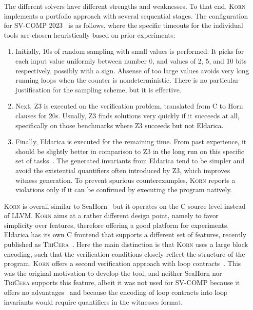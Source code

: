 \documentclass{llncs}
\newcommand{\Korn}{\textsc{Korn}\xspace}
\begin{document}
The different solvers have different strengths and weaknesses.
To that end, \Korn implements a portfolio approach with several sequential stages.
The configuration for SV-COMP 2023~\cite{SVCOMP23} is as follows,
where the specific timeouts for the individual tools are chosen heuristically based
on prior experiments:
\begin{enumerate}
    \item Initially, 10s of random sampling with small values is performed.
          It picks for each input value uniformly between number 0, and values of 2, 5, and 10 bits respectively, possibly with a sign.
          Absense of too large values avoids very long running loops
          when the counter is nondeterministic.
          There is no particular justification for the sampling scheme,
          but it is effective.
    \item Next, Z3 is executed on the verification problem, translated from C to Horn clauses for 20s. Usually, Z3 finds solutions very quickly if it succeeds at all,
          specifically on those benchmarks where Z3 succeeds but not Eldarica.
    \item Finally, Eldarica is executed for the remaining time.
          From past experience, it should be slightly better in comparison to Z3 in the long run on this specific set of tasks~\cite{ernst:arxiv2020:summaries}.
    The generated invariants from Eldarica tend to be simpler and avoid the existential quantifiers
    often introduced by Z3, which improves witness generation.
    To prevent spurious counterexamples,
    \Korn reports a violations only if it can be confirmed by executing the program natively.
\end{enumerate}
\Korn is overall similar to SeaHorn~\cite{gurfinkel2015seahorn} but it operates on the C source level instead of LLVM.
\Korn aims at a rather different design point, namely to favor simplicity over features, therefore offering a good platform for experiments.
Eldarica has its own C frontend that supports a different set of features,
recently published as \textsc{TriCera}~\cite{esen2022tricera}.
Here the main distinction is that \Korn uses a large block encoding,
such that the verification conditions closely reflect the structure of the program.
\Korn offers a second verification approach with loop contracts~\cite{hehner1999refinement,tuerk2010local,hehner2005specified,ernst:vmcai2022}.
This was the original motivation to develop the tool, and neither
SeaHorn nor \textsc{TriCera} supports this feature,
albeit it was not used for SV-COMP because
it offers no advantages~\cite{ernst:arxiv2020:summaries}
and because the encoding of loop contracts into loop invariants would require quantifiers in the witnesses format.
\end{document}
